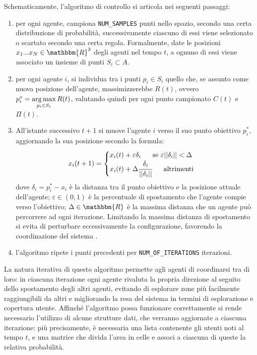 Schematicamente, l'algoritmo di controllo si articola nei seguenti passaggi:
\begin{enumerate}
    \item 
    per ogni agente, campiona \texttt{NUM\_SAMPLES} punti nello spazio, secondo una certa distribuzione di probabilità, successivamente ciascuno di essi viene selezionato o scartato secondo una certa regola.
    Formalmente, date le posizioni $x_1...x_N\in \mathbbm{R}^3$ degli agenti nel tempo $t$, a ognuno di essi viene associato un insieme di punti $S_i\subset A$.

    \item
    per ogni agente $i$, si individua tra i punti $p_i\in S_i$ quello che, se assunto come nuova posizione dell'agente, massimizzerebbe $R(t)$, ovvero $p^*_i=\operatorname*{arg\,max}\limits_{p_i\in S_i} R(t)$, valutando quindi per ogni punto campionato $C(t)$ e $\Pi(t)$.

    \item
    All'istante successivo $t+1$ si muove l'agente $i$ verso il suo punto obiettivo $p_i^*$, aggiornando la sua posizione secondo la formula:
    \begin{equation}
        x_i(t+1) = \begin{cases}
            x_i(t)+\varepsilon\delta_i\ \ \ \ \text{ se } \varepsilon||\delta_i||<\Delta \\
            x_i(t)+\Delta \cfrac{\delta_i}{||\delta_i||}\ \ \ \ \text{ altrimenti}
        \end{cases}
    \end{equation}
    dove $\delta_i=p_i^*-x_i$ è la distanza tra il punto obiettivo e la posizione attuale dell'agente; $\varepsilon\in(0,1)$ è la percentuale di spostamento che l'agente compie verso l'obiettivo; $\Delta\in 
    \mathbbm{R}$ è la massima distanza che un agente può percorrere ad ogni iterazione. Limitando la massima distanza di spostamento si evita di perturbare eccessivamente la configurazione, favorendo la coordinazione del sistema \cite{PangBao2021Eorw}. 

    \item 
    l'algoritmo ripete i punti precedenti per \texttt{NUM\_OF\_ITERATIONS} iterazioni.
\end{enumerate}

La natura iterativa di questo algoritmo permette agli agenti di coordinarsi tra di loro: in ciascuna iterazione ogni agente rivaluta la propria direzione al seguito dello spostamento degli altri agenti, evitando di esplorare zone più facilmente raggiungibili da altri e migliorando la resa del sistema in termini di esplorazione e copertura utente.
Affinché l'algoritmo possa funzionare correttamente si rende necessario l'utilizzo di alcune strutture dati, che verranno aggiornate a ciascuna iterazione: più precisamente, è necessaria una lista contenente gli utenti noti al tempo $t$, e una matrice che divida l'area in celle e associ a ciascuna di queste la relativa probabilità.

